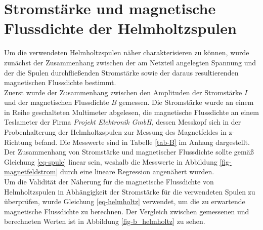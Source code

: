 \documentclass[page,pdftex,12pt,a4paper,twoside,openright]{scrbook}
\begin{document}
\section{Stromstärke und magnetische Flussdichte der Helmholtzspulen \label{sec-b_helmholtz}}
\label{sec:orgdf88dbe}
Um die verwendeten Helmholtzspulen näher charakterisieren zu können, wurde zunächst der Zusammenhang zwischen der am Netzteil angelegten Spannung und der die Spulen durchfließenden Stromstärke sowie der daraus resultierenden magnetischen Flussdichte bestimmt.\\

Zuerst wurde der Zusammenhang zwischen den Amplituden der Stromstärke \(I\) und der magnetischen Flussdichte \(B\) gemessen. Die Stromstärke wurde an einem in Reihe geschalteten Multimeter abgelesen, die magnetische Flussdichte an einem Teslameter der Firma \emph{Projekt Elektronik GmbH}, dessen Messkopf sich in der Probenhalterung der Helmholtzspulen zur Messung des Magnetfeldes in z-Richtung befand. Die Messwerte sind in Tabelle \ref{tab-B} im Anhang dargestellt. Der Zusammenhang von Stromstärke und magnetischer Flussdichte sollte gemäß Gleichung \ref{eq-spule} linear sein, weshalb die Messwerte in Abbildung \ref{fig-magnetfeldstrom} durch eine lineare Regression angenähert wurden.\\

Um die Validität der Näherung für die magnetische Flussdichte von Helmholtzspulen in Abhängigkeit der Stromstärke für die verwendeten Spulen zu überprüfen, wurde Gleichung \ref{eq-helmholtz} verwendet, um die zu erwartende magnetische Flussdichte zu berechnen. Der Vergleich zwischen gemessenen und berechneten Werten ist in Abbildung \ref{fig-b_helmholtz} zu sehen.\\
\end{document}
